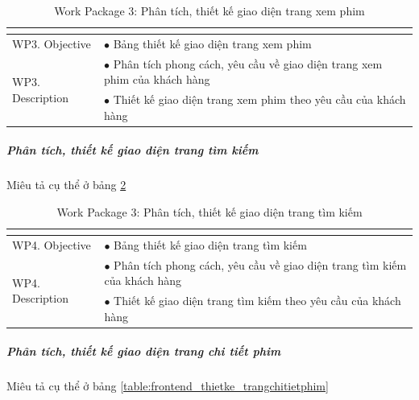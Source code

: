 \documentclass[a4paper]{book}
\begin{document}
\begin{table}[h!]
	\begin{center}
		\begin{tabular}{|p{4cm}|p{10cm}|}
			\hline
			\multicolumn{2}{|c|}{\cellcolor[HTML]{363636}{\color[HTML]{FFFFFF}Work package 3: Phân tích, thiết kế giao diện trang xem phim}}\\
			\hline
			\multirow{1}{*}{WP3. Objective} & $\bullet$ Bảng thiết kế giao diện trang xem phim\\
			\hline
			\multirow{2}{*}{WP3. Description} & $\bullet$ Phân tích phong cách, yêu cầu về giao diện trang xem phim của khách hàng \\
			& $\bullet$ Thiết kế giao diện trang xem phim theo yêu cầu của khách hàng\\
			\hline
		\end{tabular}
		\caption{Work Package 3: Phân tích, thiết kế giao diện trang xem phim}
		\label{table:frontend_thietke_trangxemphim}
	\end{center}
\end{table}
\subparagraph{Phân tích, thiết kế giao diện trang tìm kiếm} Miêu tả cụ thể ở bảng \ref{table:frontend_thietke_trangtimkiem}
\begin{table}[h!]
	\begin{center}
		\begin{tabular}{|p{4cm}|p{10cm}|}
			\hline
			\multicolumn{2}{|c|}{\cellcolor[HTML]{363636}{\color[HTML]{FFFFFF}Work package 4: Phân tích, thiết kế giao diện trang tìm kiếm}}\\
			\hline
			\multirow{1}{*}{WP4. Objective} & $\bullet$ Bảng thiết kế giao diện trang tìm kiếm\\
			\hline
			\multirow{2}{*}{WP4. Description} & $\bullet$ Phân tích phong cách, yêu cầu về giao diện trang tìm kiếm của khách hàng \\
			& $\bullet$ Thiết kế giao diện trang tìm kiếm theo yêu cầu của khách hàng\\
			\hline
		\end{tabular}
		\caption{Work Package 3: Phân tích, thiết kế giao diện trang tìm kiếm}
		\label{table:frontend_thietke_trangtimkiem}
	\end{center}
\end{table}
\subparagraph{Phân tích, thiết kế giao diện trang chi tiết phim} Miêu tả cụ thể ở bảng \ref{table:frontend_thietke_trangchitietphim}
\end{document}
